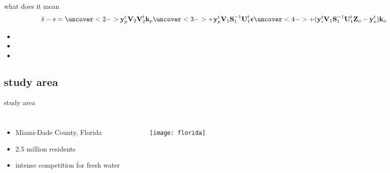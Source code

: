 \documentclass{beamer}
\begin{document}
\begin{frame}{what does it mean}
\begin{equation*}
\hat{s} - s = \uncover<2->{\textbf{y}^t_p\textbf{V}_2\textbf{V}^t_2\textbf{k}_p}  \uncover<3->{+ \textbf{y}^t_p\textbf{V}_1\textbf{S}^{-1}_1\textbf{U}^t_1\boldsymbol{\epsilon}}
\uncover<4->{ + (\textbf{y}^t_i\textbf{V}_1\textbf{S}^{-1}_1\textbf{U}^t_1\textbf{Z}_o - \textbf{y}^t_o)\textbf{k}_o}
\end{equation*}
\begin{itemize}
\item{}
\item{}
\item{}
\end{itemize}
\end{frame}



\subsection{study area}

\begin{frame}{study area}
\begin{columns}[c]
\column{2.5in}
\begin{itemize}
\item{Miami-Dade County, Florida}
\item{2.5 million residents}
\item{intense competition for fresh water}
\end{itemize}
\column{2.5in}
\begin{figure}
\vspace{-0.25cm} \texttt{[image: florida]}
\end{figure}
\end{columns}
\end{frame}
\end{document}
